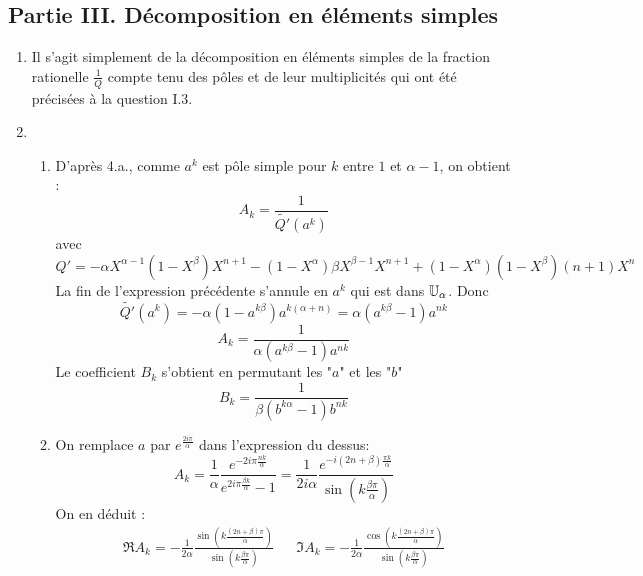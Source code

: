 \subsection*{Partie III. Décomposition en éléments simples}
\begin{enumerate}
 \item Il s'agit simplement de la décomposition en éléments simples de la fraction rationelle $\frac{1}{Q}$ compte tenu des pôles et de leur multiplicités qui ont été précisées à la question I.3.
\item \begin{enumerate}
 \item D'après 4.a., comme $a^k$ est pôle simple pour $k$ entre $1$ et $\alpha -1$, on obtient :
\begin{displaymath}
 A_k = \frac{1}{\widetilde{Q'}(a^k)}
\end{displaymath}
avec
\begin{displaymath}
 Q'=-\alpha X^{\alpha -1}(1-X^\beta)X^{n+1}-(1-X^\alpha)\beta X^{\beta -1}X^{n+1} + (1-X^\alpha)(1-X^\beta)(n+1)X^n
\end{displaymath}
La fin de l'expression précédente s'annule en $a^k$ qui est dans $\mathbb{U}_\alpha$. Donc
\begin{displaymath}
 \widetilde{Q'}(a^k) = -\alpha(1-a^{k\beta})a^{k(\alpha + n)}= \alpha(a^{k\beta}-1)a^{nk}
\end{displaymath}
\begin{displaymath}
 A_k = \frac{1}{\alpha (a^{k\beta}-1)a^{nk}}
\end{displaymath}
Le coefficient $B_k$ s'obtient en permutant les "$a$" et les "$b$"
\begin{displaymath}
  B_k = \frac{1}{\beta (b^{k\alpha}-1)b^{nk}}
\end{displaymath}

\item On remplace $a$ par $e^{\frac{2i\pi}{\alpha}}$ dans l'expression du dessus:
\begin{displaymath}
 A_k = \frac{1}{\alpha}\frac{e^{-2i\pi\frac{nk}{\alpha}}}{e^{2i\pi\frac{\beta k}{\alpha}}-1}
= \frac{1}{2i\alpha}\frac{e^{-i(2n+\beta)\frac{\pi k}{\alpha}}}{\sin\left( k\frac{\beta \pi}{\alpha}\right) }
\end{displaymath}
On en déduit :
\begin{align*}
 \Re A_k
= -\frac{1}{2\alpha}\frac{\sin\left( k\frac{(2n+\beta)\pi}{\alpha}\right) }{\sin\left( k\frac{\beta \pi}{\alpha}\right) }
 & & 
\Im A_k
= -\frac{1}{2\alpha}\frac{\cos\left( k\frac{(2n+\beta)\pi}{\alpha}\right) }{\sin\left( k\frac{\beta \pi}{\alpha}\right) }
\end{align*}
\end{enumerate}


\end{enumerate}

